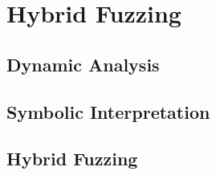 \section{Hybrid Fuzzing}
\subsection{Dynamic Analysis}
\subsection{Symbolic Interpretation}
\subsection{Hybrid Fuzzing}
